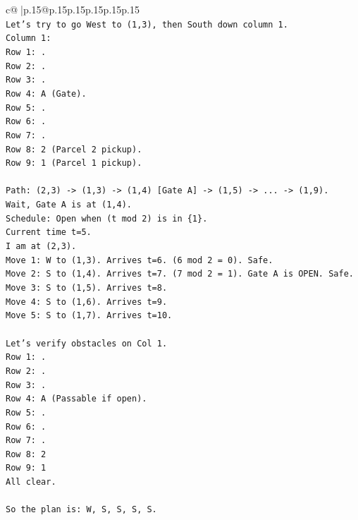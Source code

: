 \documentclass{article}
\begin{document}
{\begin{supertabular}{c@{$\;$}|p{.15\linewidth}@{}p{.15\linewidth}p{.15\linewidth}p{.15\linewidth}p{.15\linewidth}p{.15\linewidth}}
{{{\\ 
\texttt{Let's try to go West to (1,3), then South down column 1.} \\
\texttt{Column 1:} \\
\texttt{Row 1: .} \\
\texttt{Row 2: .} \\
\texttt{Row 3: .} \\
\texttt{Row 4: A (Gate).} \\
\texttt{Row 5: .} \\
\texttt{Row 6: .} \\
\texttt{Row 7: .} \\
\texttt{Row 8: 2 (Parcel 2 pickup).} \\
\texttt{Row 9: 1 (Parcel 1 pickup).} \\
\\ 
\texttt{Path: (2,3) {-}> (1,3) {-}> (1,4) {[}Gate A{]} {-}> (1,5) {-}> ... {-}> (1,9).} \\
\texttt{Wait, Gate A is at (1,4).} \\
\texttt{Schedule: Open when (t mod 2) is in \{1\}.} \\
\texttt{Current time t=5.} \\
\texttt{I am at (2,3).} \\
\texttt{Move 1: W to (1,3). Arrives t=6. (6 mod 2 = 0). Safe.} \\
\texttt{Move 2: S to (1,4). Arrives t=7. (7 mod 2 = 1). Gate A is OPEN. Safe.} \\
\texttt{Move 3: S to (1,5). Arrives t=8.} \\
\texttt{Move 4: S to (1,6). Arrives t=9.} \\
\texttt{Move 5: S to (1,7). Arrives t=10.} \\
\\ 
\texttt{Let's verify obstacles on Col 1.} \\
\texttt{Row 1: .} \\
\texttt{Row 2: .} \\
\texttt{Row 3: .} \\
\texttt{Row 4: A (Passable if open).} \\
\texttt{Row 5: .} \\
\texttt{Row 6: .} \\
\texttt{Row 7: .} \\
\texttt{Row 8: 2} \\
\texttt{Row 9: 1} \\
\texttt{All clear.} \\
\\ 
\texttt{So the plan is: W, S, S, S, S.} \\
}}}
\end{supertabular}}
\end{document}
